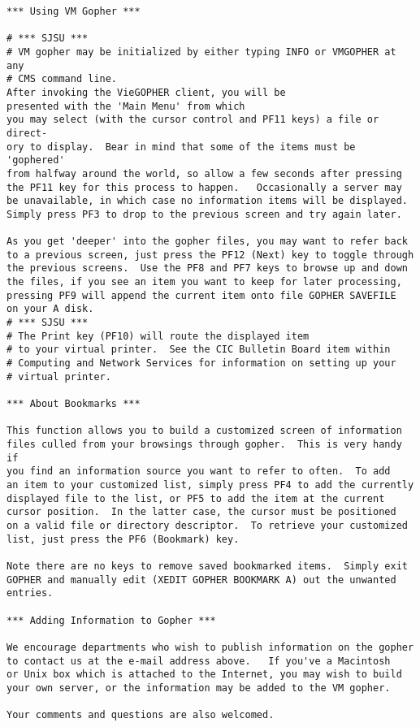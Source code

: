 \begin{verbatim}
*** Using VM Gopher ***

# *** SJSU ***
# VM gopher may be initialized by either typing INFO or VMGOPHER at any
# CMS command line.
After invoking the VieGOPHER client, you will be
presented with the 'Main Menu' from which
you may select (with the cursor control and PF11 keys) a file or direct-
ory to display.  Bear in mind that some of the items must be 'gophered'
from halfway around the world, so allow a few seconds after pressing
the PF11 key for this process to happen.   Occasionally a server may
be unavailable, in which case no information items will be displayed.
Simply press PF3 to drop to the previous screen and try again later.

As you get 'deeper' into the gopher files, you may want to refer back
to a previous screen, just press the PF12 (Next) key to toggle through
the previous screens.  Use the PF8 and PF7 keys to browse up and down
the files, if you see an item you want to keep for later processing,
pressing PF9 will append the current item onto file GOPHER SAVEFILE
on your A disk.
# *** SJSU ***
# The Print key (PF10) will route the displayed item
# to your virtual printer.  See the CIC Bulletin Board item within
# Computing and Network Services for information on setting up your
# virtual printer.

*** About Bookmarks ***

This function allows you to build a customized screen of information
files culled from your browsings through gopher.  This is very handy if
you find an information source you want to refer to often.  To add
an item to your customized list, simply press PF4 to add the currently
displayed file to the list, or PF5 to add the item at the current
cursor position.  In the latter case, the cursor must be positioned
on a valid file or directory descriptor.  To retrieve your customized
list, just press the PF6 (Bookmark) key.

Note there are no keys to remove saved bookmarked items.  Simply exit
GOPHER and manually edit (XEDIT GOPHER BOOKMARK A) out the unwanted
entries.

*** Adding Information to Gopher ***

We encourage departments who wish to publish information on the gopher
to contact us at the e-mail address above.   If you've a Macintosh
or Unix box which is attached to the Internet, you may wish to build
your own server, or the information may be added to the VM gopher.

Your comments and questions are also welcomed.
\end{verbatim}

